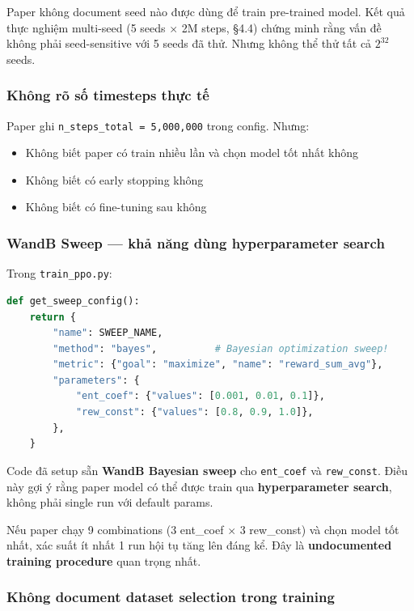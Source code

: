 \documentclass[11pt]{article}
\begin{document}
Paper không document seed nào được dùng để train pre-trained model. Kết quả thực nghiệm multi-seed (5 seeds $\times$ 2M steps, \S4.4) chứng minh rằng vấn đề không phải seed-sensitive với 5 seeds đã thử. Nhưng không thể thử tất cả $2^{32}$ seeds.

\subsubsection{Không rõ số timesteps thực tế}

Paper ghi \texttt{n\_steps\_total = 5,000,000} trong config. Nhưng:
\begin{itemize}
  \item Không biết paper có train nhiều lần và chọn model tốt nhất không
  \item Không biết có early stopping không
  \item Không biết có fine-tuning sau không
\end{itemize}

\subsubsection{WandB Sweep --- khả năng dùng hyperparameter search}

Trong \texttt{train\_ppo.py}:
\begin{lstlisting}[language=Python]
def get_sweep_config():
    return {
        "name": SWEEP_NAME,
        "method": "bayes",          # Bayesian optimization sweep!
        "metric": {"goal": "maximize", "name": "reward_sum_avg"},
        "parameters": {
            "ent_coef": {"values": [0.001, 0.01, 0.1]},
            "rew_const": {"values": [0.8, 0.9, 1.0]},
        },
    }
\end{lstlisting}

Code đã setup sẵn \textbf{WandB Bayesian sweep} cho \texttt{ent\_coef} và \texttt{rew\_const}. Điều này gợi ý rằng paper model có thể được train qua \textbf{hyperparameter search}, không phải single run với default params.

Nếu paper chạy 9 combinations ($3$ ent\_coef $\times$ $3$ rew\_const) và chọn model tốt nhất, xác suất ít nhất 1 run hội tụ tăng lên đáng kể. Đây là \textbf{undocumented training procedure} quan trọng nhất.

\subsubsection{Không document dataset selection trong training}
\end{document}
